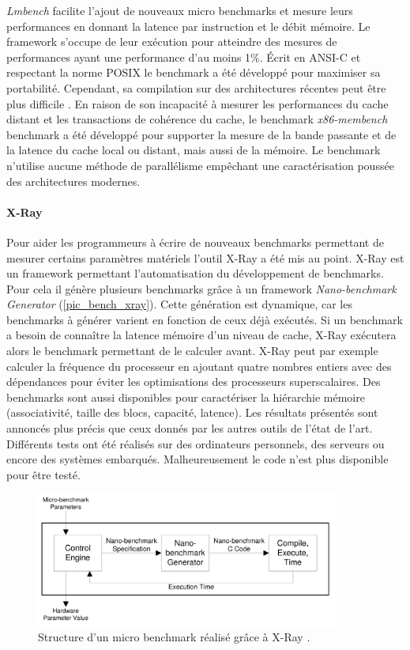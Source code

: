             \textit{Lmbench} facilite l'ajout de nouveaux micro benchmarks et mesure leurs performances en donnant la latence par instruction et le débit mémoire. Le framework s'occupe de leur exécution pour atteindre des mesures de performances ayant une performance d'au moins 1\%. Écrit en ANSI-C et respectant la norme POSIX le benchmark a été développé pour maximiser sa portabilité. Cependant, sa compilation sur des architectures récentes peut être plus difficile \cite{Yotov2004}. En raison de son incapacité à mesurer les performances du cache distant et les transactions de cohérence du cache, le benchmark \textit{x86-membench} benchmark \cite{Molka2017b} a été développé pour supporter la mesure de la bande passante et de la latence du cache local ou distant, mais aussi de la mémoire. Le benchmark n'utilise aucune méthode de parallélisme empêchant une caractérisation poussée des architectures modernes. 

        \paragraph{X-Ray \cite{Yotov2004}} 
        
           Pour aider les programmeurs à écrire de nouveaux benchmarks permettant de mesurer certains paramètres matériels l'outil X-Ray a été mis au point. X-Ray est un \gls{framework} permettant l'automatisation du développement de benchmarks. Pour cela il génère plusieurs benchmarks grâce à un framework \textit{Nano-benchmark Generator} (\autoref{pic_bench_xray}). Cette génération est dynamique, car les benchmarks à générer varient en fonction de ceux déjà exécutés. Si un benchmark a besoin de connaître la latence mémoire d'un niveau de cache, X-Ray exécutera alors le benchmark permettant de le calculer avant. X-Ray peut par exemple calculer la fréquence du processeur en ajoutant quatre nombres entiers avec des dépendances pour éviter les optimisations des processeurs superscalaires. Des benchmarks sont aussi disponibles pour caractériser la hiérarchie mémoire (associativité, taille des blocs, capacité, latence). Les résultats présentés sont annoncés plus précis que ceux donnés par les autres outils de l'état de l'art. Différents tests ont été réalisés sur des ordinateurs personnels, des serveurs ou encore des systèmes embarqués. Malheureusement le code n'est plus disponible pour être testé. 
            
            \begin{figure}
                \center
                \includegraphics[width=10cm]{images/bench_xray.png}
                \caption{ Structure d'un micro benchmark réalisé grâce à X-Ray  \cite{Yotov2004}.
                \label{pic_bench_xray}}
            \end{figure}
            
